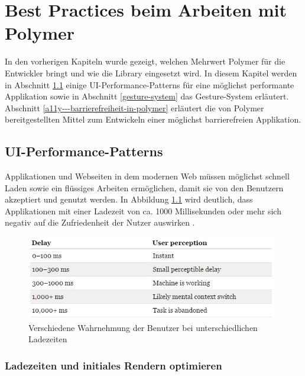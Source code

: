 \chapter{Best Practices beim Arbeiten mit Polymer}\label{best-practices-beim-arbeiten-mit-polymer}

In den vorherigen Kapiteln wurde gezeigt, welchen Mehrwert Polymer für die Entwickler bringt und wie die Library eingesetzt wird. In diesem Kapitel werden in Abschnitt \ref{ui-performance-patterns} einige \ac{UI}-Performance-Patterns für eine möglichst performante Applikation sowie in Abschnitt \ref{gesture-system} das Gesture-System erläutert. Abschnitt \ref{a11y---barrierefreiheit-in-polymer} erläutert die von Polymer bereitgestellten Mittel zum Entwickeln einer möglichst barrierefreien Applikation.


\section{UI-Performance-Patterns}\label{ui-performance-patterns}

Applikationen und Webseiten in dem modernen Web müssen möglichst schnell Laden sowie ein flüssiges Arbeiten ermöglichen, damit sie von den Benutzern akzeptiert und genutzt werden. In Abbildung \ref{fig:vwdbbul} wird deutlich, dass Applikationen mit einer Ladezeit von ca. 1000 Millisekunden oder mehr sich negativ auf die Zufriedenheit der Nutzer auswirken \cite{citeulike:13262776}.

\begin{figure}[htbp]
 \centering
 \includegraphics[width=11cm,keepaspectratio]{kapitel6/bilder/1-performance-user-perception-reaction-times}
 \caption{Verschiedene Wahrnehmung der Benutzer bei unterschiedlichen Ladezeiten}
 \label{fig:vwdbbul}
\end{figure}


\subsection{Ladezeiten und initiales Rendern optimieren}\label{ladezeiten-und-initiales-rendern-optimieren}

